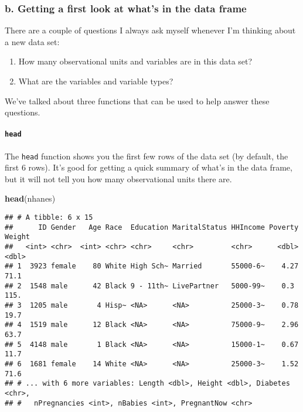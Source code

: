 \documentclass[]{article}
\newenvironment{Shaded}{\begin{snugshade}}{\end{snugshade}}
\newcommand{\KeywordTok}[1]{\textcolor[rgb]{0.13,0.29,0.53}{\textbf{#1}}}
\newcommand{\NormalTok}[1]{#1}
\providecommand{\tightlist}{%
  \setlength{\itemsep}{0pt}\setlength{\parskip}{0pt}}
\let\oldparagraph\paragraph
\renewcommand{\paragraph}[1]{\oldparagraph{#1}\mbox{}}
\begin{document}
\subsubsection{b. Getting a first look at what's in the data
frame}\label{b.-getting-a-first-look-at-whats-in-the-data-frame}

There are a couple of questions I always ask myself whenever I'm
thinking about a new data set:

\begin{enumerate}
\def\labelenumi{\arabic{enumi}.}
\tightlist
\item
  How many observational units and variables are in this data set?
\item
  What are the variables and variable types?
\end{enumerate}

We've talked about three functions that can be used to help answer these
questions.

\paragraph{\texorpdfstring{\texttt{head}}{head}}\label{head}

The \texttt{head} function shows you the first few rows of the data set
(by default, the first 6 rows). It's good for getting a quick summary of
what's in the data frame, but it will not tell you how many
observational units there are.

\begin{Shaded}
\begin{Highlighting}[]
\KeywordTok{head}\NormalTok{(nhanes)}
\end{Highlighting}
\end{Shaded}

\begin{verbatim}
## # A tibble: 6 x 15
##      ID Gender   Age Race  Education MaritalStatus HHIncome Poverty Weight
##   <int> <chr>  <int> <chr> <chr>     <chr>         <chr>      <dbl>  <dbl>
## 1  3923 female    80 White High Sch~ Married       55000-6~    4.27   71.1
## 2  1548 male      42 Black 9 - 11th~ LivePartner   5000-99~    0.3   115. 
## 3  1205 male       4 Hisp~ <NA>      <NA>          25000-3~    0.78   19.7
## 4  1519 male      12 Black <NA>      <NA>          75000-9~    2.96   63.7
## 5  4148 male       1 Black <NA>      <NA>          15000-1~    0.67   11.7
## 6  1681 female    14 White <NA>      <NA>          25000-3~    1.52   71.6
## # ... with 6 more variables: Length <dbl>, Height <dbl>, Diabetes <chr>,
## #   nPregnancies <int>, nBabies <int>, PregnantNow <chr>
\end{verbatim}
\end{document}
